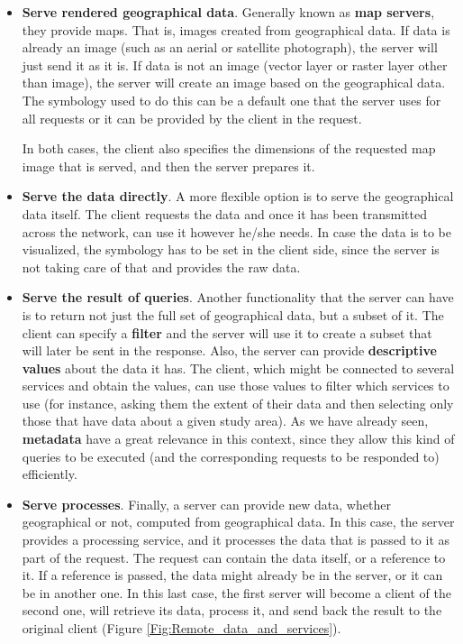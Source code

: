 \begin{itemize}
\item \textbf{Serve rendered geographical data}. Generally known as \textbf{map servers}, they provide maps. That is, images created from geographical data. If data is already an image (such as an aerial or satellite photograph), the server will just send it as it is. If data is not an image (vector layer or raster layer other than image), the server will create an image based on the geographical data. The symbology used to do this can be a default one that the server uses for all requests or it can be provided by the client in the request. 

In both cases, the client also specifies the dimensions of the requested map image that is served, and then the server prepares it.


\item \textbf{Serve the data directly}. A more flexible option is to serve the geographical data itself. The client requests the data and once it has been transmitted across the network, can use it however he/she needs. In case the data is to be visualized, the symbology has to be set in the client side, since the server is not taking care of that and provides the raw data.


\item \textbf{Serve the result of queries}. Another functionality that the server can have is to return not just the full set of geographical data, but a subset of it. The client can specify a \textbf{filter} and the server will use it to create a subset that will later be sent in the response. Also, the server can provide \textbf{descriptive values} about the data it has. The client, which might be connected to several services and obtain the values, can use those values to filter which services to use (for instance, asking them the extent of their data and then selecting only those that have data about a given study area). As we have already seen, \textbf{metadata} have a great relevance in this context, since they allow this kind of queries to be executed (and the corresponding requests to be responded to) efficiently.

\item \textbf{Serve processes}. Finally, a server can provide new data, whether geographical or not, computed from geographical data. In this case, the server provides a processing service, and it processes the data that is passed to it as part of the request. The request can contain the data itself, or a reference to it. If a reference is passed, the data might already be in the server, or it can be in another one. In this last case, the first server will become a client of the second one, will retrieve its data, process it, and send back the result to the original client (Figure \ref{Fig:Remote_data_and_services}).



\end{itemize}
